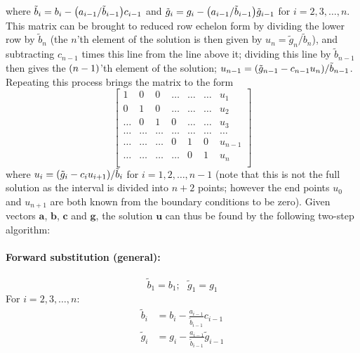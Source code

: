 \documentclass[a4paper,english]{article}
\renewcommand\vec{\mathbf}
\let\originalleft\left
\let\originalright\right
\renewcommand{\left}{\mathopen{}\mathclose\bgroup\originalleft}
\renewcommand{\right}{\aftergroup\egroup\originalright}
\begin{document}
where $\tilde{b}_i = b_i - \left(a_{i-1}/\tilde{b}_{i-1}\right)c_{i-1}$ and $\tilde{g}_i = g_i-\left(a_{i-1}/\tilde{b}_{i-1}\right)\tilde{g}_{i-1}$ for $i = 2,3,\dots,n$. This matrix can be brought to reduced row echelon form by dividing the lower row by $\tilde{b}_n$ (the $n$'th element of the solution is then given by $u_n = \tilde{g}_n/\tilde{b}_n$), and subtracting $c_{n-1}$ times this line from the line above it; dividing this line by $\tilde{b}_{n-1}$ then gives the $\left(n-1\right)$'th element of the solution; $u_{n-1} = \left(\tilde{g}_{n-1}-c_{n-1}u_n\right)/\tilde{b}_{n-1}$. Repeating this process brings the matrix to the form
\begin{equation}
  \begin{bmatrix}
    1 & 0 & 0 &\dots   & \dots &\dots & u_1\\
    0 & 1 & 0 &\dots &\dots &\dots & u_2\\
    \dots & 0 & 1 & 0 & \dots & \dots & u_3\\
    \dots & \dots   & \dots &\dots &\dots & \dots & \dots\\
    \dots & \dots & \dots & 0 &1& 0 & u_{n-1}\\
    \dots & \dots & \dots & \dots & 0 & 1 & u_n\\
  \end{bmatrix}
\end{equation}
where $u_i = \left(\tilde{g}_i-c_iu_{i+1}\right)/\tilde{b}_i$ for $i= 1,2,\dots,n-1$ (note that this is not the full solution as the interval is divided into $n+2$ points; however the end points $u_0$ and $u_{n+1}$ are both known from the boundary conditions to be zero). Given vectors $\vec{a}$, $\vec{b}$, $\vec{c}$ and $\vec{g}$, the solution $\vec{u}$ can thus be found by the following two-step algorithm:
\paragraph{Forward substitution (general):}
\begin{equation}
  \tilde{b}_1 = b_1;\text{ }\tilde{g}_1 = g_1
\end{equation}
For $i = 2,3,\dots,n$:
\begin{align}
  \tilde{b}_i &= b_i - \frac{a_{i-1}}{\tilde{b}_{i-1}}c_{i-1} \\
  \tilde{g}_i &= g_i-\frac{a_{i-1}}{\tilde{b}_{i-1}}\tilde{g}_{i-1}
\end{align}
\end{document}
